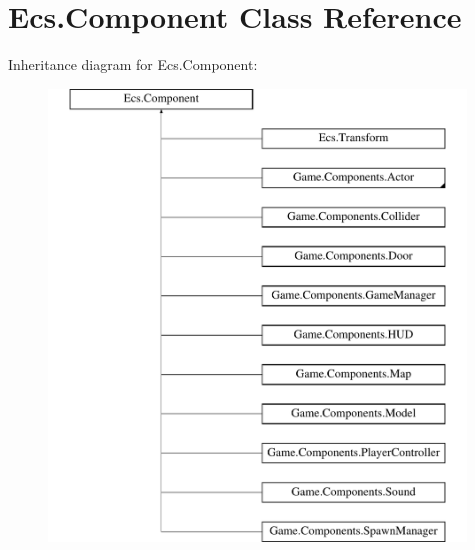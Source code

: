 \hypertarget{class_ecs_1_1_component}{}\section{Ecs.\+Component Class Reference}
\label{class_ecs_1_1_component}
Inheritance diagram for Ecs.\+Component\+:\begin{figure}[H]
\begin{center}
\leavevmode
\includegraphics[height=12.000000cm]{class_ecs_1_1_component}
\end{center}
\end{figure}
